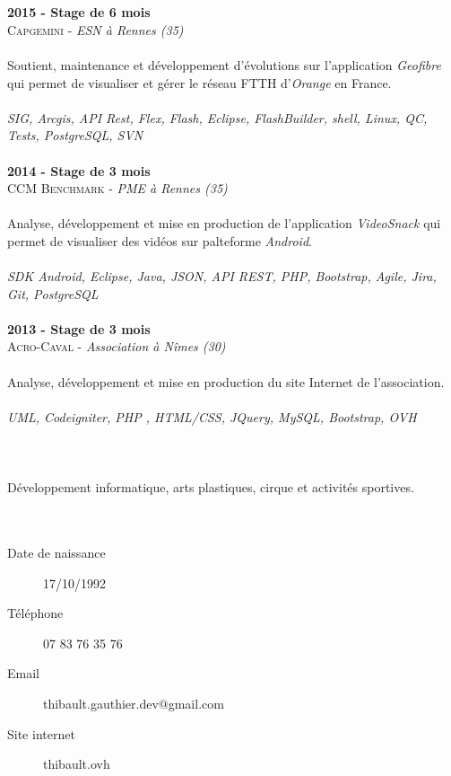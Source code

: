 \begin{titlepage}
\begin{minipage}[t]{8.7cm}
    \\\\
    \textbf{2015 - Stage de 6 mois} \\
    \textsc{Capgemini} -
    \textit{ESN à Rennes (35)}
    \\\\Soutient, maintenance et développement d'évolutions sur l'application \textit{Geofibre} qui permet de visualiser et gérer le réseau FTTH d'\textit{Orange} en France.
    \\\\\textit{SIG, Arcgis, API Rest, Flex, Flash, Eclipse, FlashBuilder, shell, Linux, QC, Tests, PostgreSQL, SVN}
    \\\\\textbf{2014 - Stage de 3 mois} \\
    \textsc{CCM Benchmark} -
     \textit{PME à Rennes (35)}
    \\\\Analyse, développement et mise en production de l'application \textit{VideoSnack} qui permet de visualiser des vidéos sur palteforme \textit{Android}.
    \\\\\textit{SDK Android, Eclipse, Java, JSON, API REST, PHP, Bootstrap, Agile, Jira, Git, PostgreSQL}
    \\\\\textbf{2013 - Stage de 3 mois} \\
    \textsc{Acro-Caval} -
    \textit{Association à Nîmes (30)}
    \\\\Analyse, développement et mise en production du site Internet de l'association.
    \\\\\textit{UML, Codeigniter, PHP , HTML/CSS, JQuery, MySQL, Bootstrap, OVH}
    \\\\\\\\
    Développement informatique, arts plastiques,
    cirque et activités sportives.
    \\\\\\
    \begin{description}%
      \item[Date de naissance] 17/10/1992
      \item[Téléphone] 07 83 76 35 76
      \item[Email] thibault.gauthier.dev@gmail.com
      \item[Site internet] thibault.ovh
    \end{description}


\end{minipage}
\end{titlepage}
